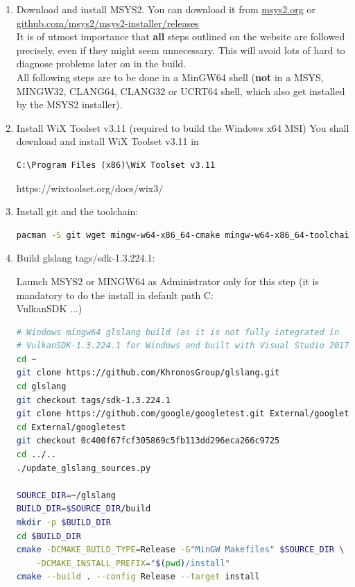 \begin{enumerate}

\item Download and install MSYS2. You can download it from \href{https://www.msys2.org/}{msys2.org} or \href{https://github.com/msys2/msys2-installer/releases}{github.com/msys2/msys2-installer/releases}\\
It is of utmost importance that \textbf{all} steps outlined on the website are followed precisely, even if they might
seem unnecessary.
This will avoid lots of hard to diagnose problems later on in the build.\\

All following steps are to be done in a MinGW64 shell (\textbf{not} in a MSYS, MINGW32, CLANG64, CLANG32 or UCRT64 shell,
which also get installed by the MSYS2 installer).

\item Install WiX Toolset v3.11 (required to build the Windows x64 MSI)
You shall download and install WiX Toolset v3.11 in \begin{verbatim}C:\Program Files (x86)\WiX Toolset v3.11\end{verbatim}
https://wixtoolset.org/docs/wix3/

\item Install git and the toolchain:

\begin{lstlisting}[language=sh, numbers=none]
pacman -S git wget mingw-w64-x86_64-cmake mingw-w64-x86_64-toolchain
\end{lstlisting}

\item Build glslang tags/sdk-1.3.224.1:

Launch MSYS2 or MINGW64 as Administrator only for this step (it is mandatory to do the install in default path C:\\VulkanSDK ...)
\begin{lstlisting}[language=sh, numbers=none]
# Windows mingw64 glslang build (as it is not fully integrated in
# VulkanSDK-1.3.224.1 for Windows and built with Visual Studio 2017)
cd ~
git clone https://github.com/KhronosGroup/glslang.git
cd glslang
git checkout tags/sdk-1.3.224.1
git clone https://github.com/google/googletest.git External/googletest
cd External/googletest
git checkout 0c400f67fcf305869c5fb113dd296eca266c9725
cd ../..
./update_glslang_sources.py

SOURCE_DIR=~/glslang
BUILD_DIR=$SOURCE_DIR/build
mkdir -p $BUILD_DIR
cd $BUILD_DIR
cmake -DCMAKE_BUILD_TYPE=Release -G"MinGW Makefiles" $SOURCE_DIR \
	-DCMAKE_INSTALL_PREFIX="$(pwd)/install"
cmake --build . --config Release --target install
\end{lstlisting}


\end{enumerate}
